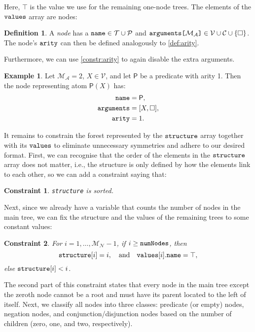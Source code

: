 \documentclass[letterpaper]{article}
\newtheorem{constraint}{Constraint}
\theoremstyle{definition}
\newtheorem{definition}{Definition}
\newtheorem{example}{Example}
\newcommand{\variable}[1]{\texttt{\textup{#1}}}
\newcommand{\arrayd}[3]{\variable{{#1}[}{#2}\variable{]} \in {#3}}
\newcommand{\predicates}{\mathcal{P}}
\newcommand{\variables}{\mathcal{V}}
\newcommand{\constants}{\mathcal{C}}
\newcommand{\tokens}{\mathcal{T}}
\newcommand{\maxArity}{\mathcal{M}_{\mathcal{A}}}
\newcommand{\maxNumNodes}{\mathcal{M}_{\mathcal{N}}}
\begin{document}
Here, $\top$ is the value we use for the remaining one-node trees. The
elements of the $\variable{values}$ array are nodes:

\begin{definition} \label{def:node}
  A \emph{node} has a $\variable{name} \in \tokens{} \cup \predicates{}$ and
  $\arrayd{arguments}{\maxArity{}}{\variables{} \cup \constants{} \cup \{ \Box
    \}}$. The node's $\variable{arity}$ can then be
  defined analogously to \cref{def:arity}.
\end{definition}

Furthermore, we can use \cref{constr:arity} to again disable the extra
arguments.

\begin{example}
  Let $\maxArity{} = 2$, $X \in \variables{}$, and let $\mathsf{P}$ be a
  predicate with arity 1. Then the node representing atom $\mathsf{P}(X)$ has:
  \begin{align*}
    \variable{name} &= \mathsf{P},\\
    \variable{arguments} &= [X, \Box],\\
    \variable{arity} &= 1.
  \end{align*}
\end{example}

It remains to constrain the forest represented by the $\variable{structure}$
array together with its $\variable{values}$ to eliminate unnecessary symmetries
and adhere to our desired format. First, we can recognise that the order of the
elements in the $\variable{structure}$ array does not matter, i.e., the
structure is only defined by how the elements link to each other, so we can add
a constraint saying that:

\begin{constraint}
  \variable{structure} is sorted.
\end{constraint}

Next, since we already have a variable that counts the number of nodes in the
main tree, we can fix the structure and the values of the remaining trees to
some constant values:

\begin{constraint}
  For $i = 1, \dots, \maxNumNodes{} - 1$, if $i \ge \variable{numNodes}$, then
  \[
    \variable{structure}[i] = i, \quad \text{and} \quad
    \variable{values}[i].\variable{name} = \top,
  \]
  else $\variable{structure}[i] < i$.
\end{constraint}

The second part of this constraint states that every node in the main tree
except the zeroth node cannot be a root and must have its parent located to
the left of itself. Next, we classify all nodes into three classes: predicate
(or empty) nodes, negation nodes, and conjunction/disjunction nodes based on the
number of children (zero, one, and two, respectively).
\end{document}
